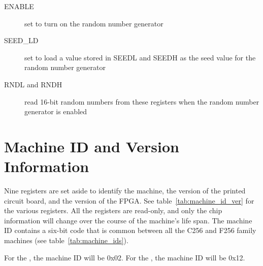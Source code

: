 \begin{description}
    \item[ENABLE] set to turn on the random number generator

    \item[SEED\_LD] set to load a value stored in SEEDL and SEEDH as the seed value for the random number generator

    \item[RNDL and RNDH] read 16-bit random numbers from these registers when the random number generator is enabled
\end{description}

\section*{Machine ID and Version Information}

Nine registers are set aside to identify the machine, the version of the printed circuit board, and the version of the FPGA. See table~\ref{tab:machine_id_ver} for the various registers. All the registers are read-only, and only the chip information will change over the course of the machine's life span. The machine ID contains a six-bit code that is common between all the C256 and F256 family machines (see table~\ref{tab:machine_ids}).

For the \jr, the machine ID will be 0x02. For the \fk, the machine ID will be 0x12.

